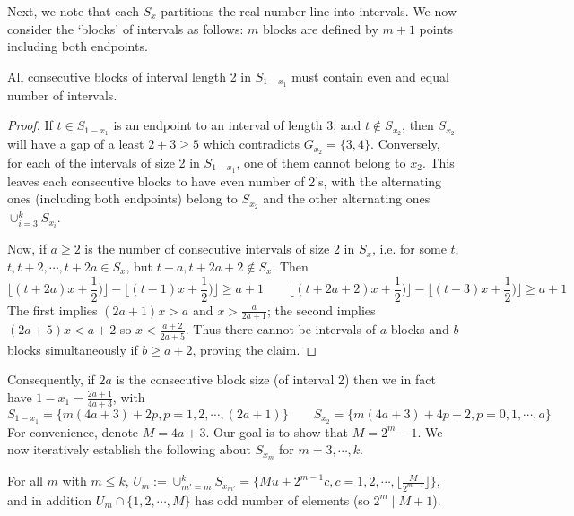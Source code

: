 \documentclass[11pt,a4paper]{article}
\begin{document}
\begin{enumerate}
        Next, we note that each $S_x$ partitions the real number line into intervals. We now consider the `blocks' of intervals as follows: 
        $m$ blocks are defined by $m+1$ points including both endpoints. 
        
        \begin{lemma}
        	All consecutive blocks of interval length 2 in $S_{1-x_1}$ must contain even and equal number of intervals. 
        \end{lemma}
        
        \begin{proof}
        	If $t\in S_{1-x_1}$ is an endpoint to an interval of length 3, and $t\not\in S_{x_2}$, then $S_{x_2}$ will have a gap of a least $2+3\ge 5$ which contradicts $G_{x_2}=\{3, 4\}$. 
        	Conversely, for each of the intervals of size 2 in $S_{1-x_1}$, one of them cannot belong to $x_2$. 
        	This leaves each consecutive blocks to have even number of 2's, with the alternating ones (including both endpoints) belong to $S_{x_2}$ and the other alternating ones $\cup_{i=3}^k S_{x_i}$. 
        	
        	Now, if $a\ge 2$ is the number of consecutive intervals of size 2 in $S_x$, i.e. for some $t$, 
        	$t, t+2, \cdots, t+2a\in S_{x}$, but $t-a, t+2a+2\not\in S_x$. 
        	Then 
        	\[
        	\lfloor (t+2a)x+\frac 12)\rfloor - \lfloor (t-1)x+\frac 12)\rfloor\ge a + 1
        	\qquad 
        	\lfloor (t+2a+2)x+\frac 12)\rfloor - \lfloor (t-3)x+\frac 12)\rfloor\ge a + 1
        	\]
        	The first implies $(2a+1)x > a$ and $x > \frac{a}{2a+1}$; 
        	the second implies $(2a+5)x < a+2$ so $x < \frac{a+2}{2a+5}$. 
        	Thus there cannot be intervals of $a$ blocks and $b$ blocks simultaneously if $b \ge a + 2$, proving the claim. 
        \end{proof}
		
		Consequently, if $2a$ is the consecutive block size (of interval 2) then we in fact have $1 - x_1 = \frac{2a + 1}{4a + 3}$, with 
		\[
		S_{1-x_1} = \{m(4a + 3) + 2p, p = 1, 2, \cdots, (2a+1)\}
		\qquad 
		S_{x_2} = \{m(4a + 3) + 4p+2, p = 0, 1, \cdots, a\}
		\]
		For convenience, denote $M = 4a + 3$. 
		Our goal is to show that $M = 2^m-1$. 
		We now iteratively establish the following about $S_{x_m}$ for $m=3, \cdots, k$. 
		
		\begin{lemma}
			For all $m$ with $m\le k$, $U_{m} := \cup_{m'=m}^k S_{x_{m'}} = \{Mu + 2^{m-1}c, c = 1, 2, \cdots, \lfloor \frac{M}{2^{m-1}}\rfloor\}$, 
			and in addition $U_m\cap \{1, 2, \cdots, M\}$ has odd number of elements (so $2^m \mid M + 1$). 
		\end{lemma}
	    

\end{enumerate}
\end{document}
